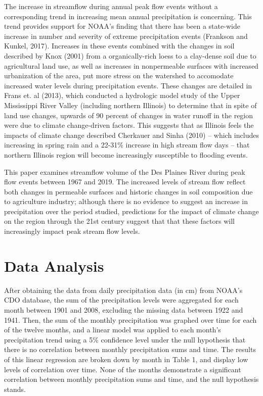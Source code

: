 \documentclass{article}\usepackage[]{graphicx}\usepackage[]{color}
\begin{document}
The increase in streamflow during annual peak flow events without a corresponding trend in increasing mean annual precipitation is concerning.  This trend provides support for NOAA's finding that there has been a state-wide increase in number and severity of extreme precipitation events (Frankson and Kunkel, 2017).  Increases in these events combined with the changes in soil described by Knox (2001) from a organically-rich loess to a clay-dense soil due to agricultural land use, as well as increases in nonpermeable surfaces with increased urbanization of the area, put more stress on the watershed to accomodate increased water levels during precipitation events.  These changes are detailed in Frans et. al (2013), which conducted a hydrologic model study of the Upper Mississippi River Valley (including northern Illinois) to determine that in spite of land use changes, upwards of 90 percent of changes in water runoff in the region were due to climate change-driven factors.  This suggests that as Illinois feels the impacts of climate change described Cherkauer and Sinha (2010) -- which includes increasing in spring rain and a 22-31\% increase in high stream flow days -- that northern Illinois region will become increasingly susceptible to flooding events.

This paper examines streamflow volume of the Des Plaines River during peak flow events between 1967 and 2019.  The increased levels of stream flow reflect both changes in permeable surfaces and historic changes in soil composition due to agriculture industry; although there is no evidence to suggest an increase in precipitation over the period studied, predictions for the impact of climate change on the region through the 21st century suggest that that these factors will increasingly impact peak stream flow levels.
  
\section*{Data Analysis}

After obtaining the data from daily precipitation data (in cm) from NOAA's CDO database, the sum of the precipitation levels were aggregated for each month between 1901 and 2008, excluding the missing data between 1922 and 1941.  Then, the sum of the monthly precipitation was graphed over time for each of the twelve months, and a linear model was applied to each month's precipitation trend using a 5\% confidence level under the null hypothesis that there is no correlation between monthly precipitation sums and time.  The results of this linear regression are broken down by month in Table 1, and display low levels of correlation over time.  None of the months demonstrate a significant correlation between monthly precipitation sums and time, and the null hypothesis stands.
\end{document}
